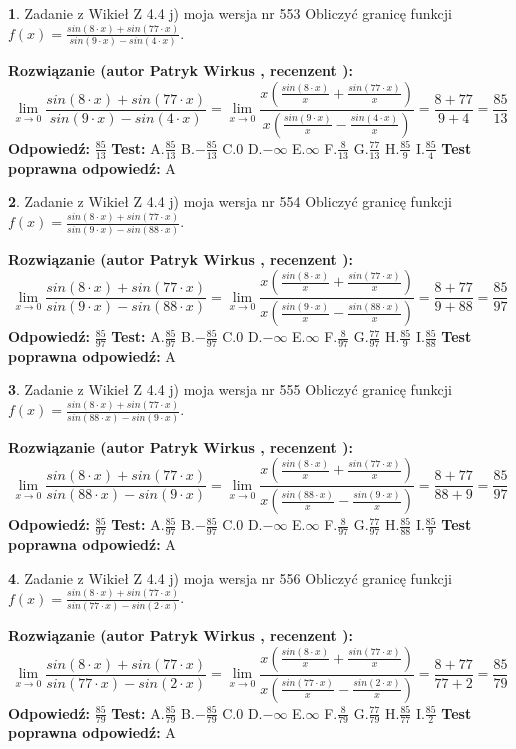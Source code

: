 \documentclass[12pt, a4paper]{article}
\theoremstyle{definition} %
\newtheorem{zad}{}
\newcommand{\zadStart}[1]{\begin{zad}#1\newline}
\newcommand{\zadStop}{\end{zad}}
\newcommand{\rozwStart}[2]{\noindent \textbf{Rozwiązanie (autor #1 , recenzent #2): }\newline}
\newcommand{\rozwStop}{\newline}
\newcommand{\odpStart}{\noindent \textbf{Odpowiedź:}\newline}
\newcommand{\odpStop}{\newline}
\newcommand{\testStart}{\noindent \textbf{Test:}\newline}
\newcommand{\testStop}{\newline}
\newcommand{\kluczStart}{\noindent \textbf{Test poprawna odpowiedź:}\newline}
\newcommand{\kluczStop}{\newline}
\begin{document}
\zadStart{Zadanie z Wikieł Z 4.4 j) moja wersja nr 553}
Obliczyć granicę funkcji $f(x)=\frac{sin(8\cdot x) +sin(77\cdot x)}{sin(9\cdot x) -sin(4\cdot x)}$.
\zadStop
\rozwStart{Patryk Wirkus}{}
$$\lim\limits_{x\to 0}\frac{sin(8\cdot x) +sin(77\cdot x)}{sin(9\cdot x) -sin(4\cdot x)}=\lim\limits_{x\to 0}\frac{x(\frac{sin(8\cdot x)}{x}+\frac{sin(77\cdot x)}{x})}{x(\frac{sin(9\cdot x)}{x}-\frac{sin(4\cdot x)}{x})}=\frac{8+77}{9+4} = \frac{85}{13}$$
\rozwStop
\odpStart
$\frac{85}{13}$
\odpStop
\testStart
A.$\frac{85}{13}$
B.$-\frac{85}{13}$
C.$0$
D.$-\infty$
E.$\infty$
F.$\frac{8}{13}$
G.$\frac{77}{13}$
H.$\frac{85}{9}$
I.$\frac{85}{4}$
\testStop
\kluczStart
A
\kluczStop



\zadStart{Zadanie z Wikieł Z 4.4 j) moja wersja nr 554}
Obliczyć granicę funkcji $f(x)=\frac{sin(8\cdot x) +sin(77\cdot x)}{sin(9\cdot x) -sin(88\cdot x)}$.
\zadStop
\rozwStart{Patryk Wirkus}{}
$$\lim\limits_{x\to 0}\frac{sin(8\cdot x) +sin(77\cdot x)}{sin(9\cdot x) -sin(88\cdot x)}=\lim\limits_{x\to 0}\frac{x(\frac{sin(8\cdot x)}{x}+\frac{sin(77\cdot x)}{x})}{x(\frac{sin(9\cdot x)}{x}-\frac{sin(88\cdot x)}{x})}=\frac{8+77}{9+88} = \frac{85}{97}$$
\rozwStop
\odpStart
$\frac{85}{97}$
\odpStop
\testStart
A.$\frac{85}{97}$
B.$-\frac{85}{97}$
C.$0$
D.$-\infty$
E.$\infty$
F.$\frac{8}{97}$
G.$\frac{77}{97}$
H.$\frac{85}{9}$
I.$\frac{85}{88}$
\testStop
\kluczStart
A
\kluczStop



\zadStart{Zadanie z Wikieł Z 4.4 j) moja wersja nr 555}
Obliczyć granicę funkcji $f(x)=\frac{sin(8\cdot x) +sin(77\cdot x)}{sin(88\cdot x) -sin(9\cdot x)}$.
\zadStop
\rozwStart{Patryk Wirkus}{}
$$\lim\limits_{x\to 0}\frac{sin(8\cdot x) +sin(77\cdot x)}{sin(88\cdot x) -sin(9\cdot x)}=\lim\limits_{x\to 0}\frac{x(\frac{sin(8\cdot x)}{x}+\frac{sin(77\cdot x)}{x})}{x(\frac{sin(88\cdot x)}{x}-\frac{sin(9\cdot x)}{x})}=\frac{8+77}{88+9} = \frac{85}{97}$$
\rozwStop
\odpStart
$\frac{85}{97}$
\odpStop
\testStart
A.$\frac{85}{97}$
B.$-\frac{85}{97}$
C.$0$
D.$-\infty$
E.$\infty$
F.$\frac{8}{97}$
G.$\frac{77}{97}$
H.$\frac{85}{88}$
I.$\frac{85}{9}$
\testStop
\kluczStart
A
\kluczStop



\zadStart{Zadanie z Wikieł Z 4.4 j) moja wersja nr 556}
Obliczyć granicę funkcji $f(x)=\frac{sin(8\cdot x) +sin(77\cdot x)}{sin(77\cdot x) -sin(2\cdot x)}$.
\zadStop
\rozwStart{Patryk Wirkus}{}
$$\lim\limits_{x\to 0}\frac{sin(8\cdot x) +sin(77\cdot x)}{sin(77\cdot x) -sin(2\cdot x)}=\lim\limits_{x\to 0}\frac{x(\frac{sin(8\cdot x)}{x}+\frac{sin(77\cdot x)}{x})}{x(\frac{sin(77\cdot x)}{x}-\frac{sin(2\cdot x)}{x})}=\frac{8+77}{77+2} = \frac{85}{79}$$
\rozwStop
\odpStart
$\frac{85}{79}$
\odpStop
\testStart
A.$\frac{85}{79}$
B.$-\frac{85}{79}$
C.$0$
D.$-\infty$
E.$\infty$
F.$\frac{8}{79}$
G.$\frac{77}{79}$
H.$\frac{85}{77}$
I.$\frac{85}{2}$
\testStop
\kluczStart
A
\kluczStop
\end{document}
